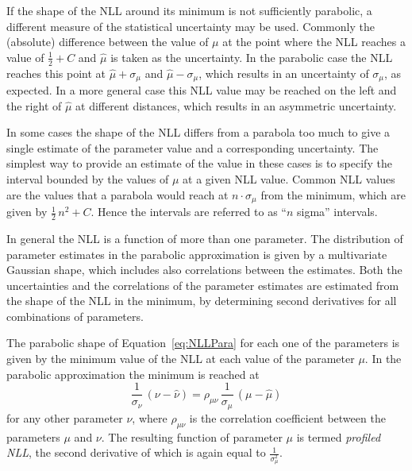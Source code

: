 If the shape of the NLL around its minimum is not sufficiently parabolic, a different measure of the statistical uncertainty may be used.
Commonly the (absolute) difference between the value of $\mu$ at the point where the NLL reaches a value of $\tfrac{1}{2}+C$ and
$\hat{\mu}$ is taken as the uncertainty. In the parabolic case the NLL reaches this point at $\hat{\mu}+\sigma_\mu$ and
$\hat{\mu}-\sigma_\mu$, which results in an uncertainty of $\sigma_\mu$, as expected. In a more general case this NLL value may be reached
on the left and the right of $\hat{\mu}$ at different distances, which results in an asymmetric uncertainty.

In some cases the shape of the NLL differs from a parabola too much to give a single estimate of the parameter value and a corresponding
uncertainty. The simplest way to provide an estimate of the value in these cases is to specify the interval bounded by the values of $\mu$
at a given NLL value. Common NLL values are the values that a parabola would reach at $n\cdot\sigma_\mu$ from the minimum, which are given
by $\tfrac{1}{2}\,n^2+C$. Hence the intervals are referred to as ``$n$ sigma'' intervals.

In general the NLL is a function of more than one parameter. The distribution of parameter estimates in the parabolic approximation is
given by a multivariate Gaussian shape, which includes also correlations between the estimates. Both the uncertainties and the correlations
of the parameter estimates are estimated from the shape of the NLL in the minimum, by determining second derivatives for all combinations
of parameters.

The parabolic shape of Equation~\ref{eq:NLLPara} for each one of the parameters is given by the minimum value of the NLL at each value of
the parameter $\mu$. In the parabolic approximation the minimum is reached at
\begin{equation}
  \frac{1}{\sigma_\nu}\, (\nu-\hat{\nu})  = \rho_{\mu\nu}\, \frac{1}{\sigma_\mu}\, (\mu-\hat{\mu})
\end{equation}
for any other parameter $\nu$, where $\rho_{\mu\nu}$ is the correlation coefficient between the parameters $\mu$ and $\nu$. The resulting
function of parameter $\mu$ is termed \emph{profiled NLL}, the second derivative of which is again equal to $\frac{1}{\sigma_\mu^2}$.

